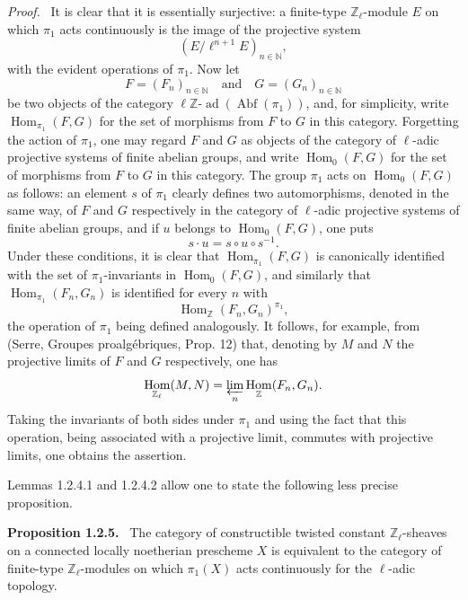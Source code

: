 \documentclass[11pt]{article}
\newenvironment{statement}[1]{\par\medskip\noindent\textbf{#1.}\ }{\par\medskip}
\newenvironment{prooftext}[1][Proof]{\par\noindent\emph{#1.}\ }{\par\medskip}
\DeclareMathOperator{\Hom}{Hom}
\providecommand{\Hom}{\operatorname{Hom}}
\providecommand{\Abf}{\operatorname{Abf}}
\providecommand{\ad}{\operatorname{ad}}
\providecommand{\Hom}{\operatorname{Hom}}
\begin{document}
\begin{prooftext}[Proof]
It is clear that it is essentially surjective: a finite-type \(\mathbb Z_\ell\)-module \(E\) on which \(\pi_1\) acts continuously is the image of the projective system
\[
(E/\ell^{n+1}E)_{n\in\mathbb N},
\]
with the evident operations of \(\pi_1\). Now let
\[
F=(F_n)_{n\in\mathbb N}\quad\text{and}\quad G=(G_n)_{n\in\mathbb N}
\]
be two objects of the category \(\ell\mathbb Z\text{-}\ad(\Abf(\pi_1))\), and, for simplicity, write \(\Hom_{\pi_1}(F,G)\) for the set of morphisms from \(F\) to \(G\) in this category. Forgetting the action of \(\pi_1\), one may regard \(F\) and \(G\) as objects of the category of \(\ell\)-adic projective systems of finite abelian groups, and write \(\Hom_0(F,G)\) for the set of morphisms from \(F\) to \(G\) in this category. The group \(\pi_1\) acts on \(\Hom_0(F,G)\) as follows: an element \(s\) of \(\pi_1\) clearly defines two automorphisms, denoted in the same way, of \(F\) and \(G\) respectively in the category of \(\ell\)-adic projective systems of finite abelian groups, and if \(u\) belongs to \(\Hom_0(F,G)\), one puts
\[
s\cdot u=s\circ u\circ s^{-1}.
\]
Under these conditions, it is clear that \(\Hom_{\pi_1}(F,G)\) is canonically identified with the set of \(\pi_1\)-invariants in \(\Hom_0(F,G)\), and similarly that \(\Hom_{\pi_1}(F_n,G_n)\) is identified for every \(n\) with
\[
\Hom_{\mathbb Z}(F_n,G_n)^{\pi_1},
\]
the operation of \(\pi_1\) being defined analogously. It follows, for example, from (Serre, Groupes proalgébriques, Prop. 12) that, denoting by \(M\) and \(N\) the projective limits of \(F\) and \(G\) respectively, one has
\[
\Hom_{\mathbb Z_\ell}(M,N)=\varprojlim_n\Hom_{\mathbb Z}(F_n,G_n).
\]
Taking the invariants of both sides under \(\pi_1\) and using the fact that this operation, being associated with a projective limit, commutes with projective limits, one obtains the assertion.
\end{prooftext}

Lemmas 1.2.4.1 and 1.2.4.2 allow one to state the following less precise proposition.

\begin{statement}{Proposition 1.2.5}
The category of constructible twisted constant \(\mathbb Z_\ell\)-sheaves on a connected locally noetherian prescheme \(X\) is equivalent to the category of finite-type \(\mathbb Z_\ell\)-modules on which \(\pi_1(X)\) acts continuously for the \(\ell\)-adic topology.
\end{statement}
\end{document}
